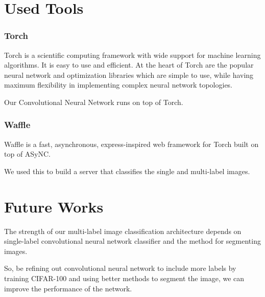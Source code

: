 \section{Used Tools}
\subsubsection{Torch}
Torch is a scientific computing framework with wide support for machine learning algorithms. It is easy to use and efficient. At the heart of Torch are the popular neural network and optimization libraries which are simple to use, while having maximum flexibility in implementing complex neural network topologies.\hfill \break 

Our Convolutional Neural Network runs on top of Torch.

\subsubsection{Waffle}
Waffle is a fast, asynchronous, express-inspired web framework for Torch built on top of ASyNC. \hfill \break

We used this to build a server that classifies the single and multi-label images.

\section{Future Works}
The strength of our multi-label image classification architecture depends on single-label convolutional neural network classifier and the method for segmenting images.\hfill \break

So, be refining out convolutional neural network to include more labels by training CIFAR-100 and using better methods to segment the image, we can improve the performance of the network.